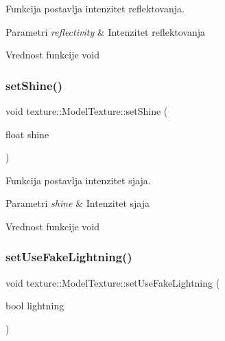 Funkcija postavlja intenzitet reflektovanja. 


\begin{DoxyParams}{Parametri}
{\em reflectivity} & Intenzitet reflektovanja \\
\hline
\end{DoxyParams}
\begin{DoxyReturn}{Vrednost funkcije}
void 
\end{DoxyReturn}
\mbox{\label{classtexture_1_1ModelTexture_a782076c3a92f7d92cd45a92c5ef088a1}} 
\subsubsection{\texorpdfstring{set\+Shine()}{setShine()}}
{\footnotesize\ttfamily void texture\+::\+Model\+Texture\+::set\+Shine (\begin{DoxyParamCaption}\item[{float}]{shine }\end{DoxyParamCaption})}



Funkcija postavlja intenzitet sjaja. 


\begin{DoxyParams}{Parametri}
{\em shine} & Intenzitet sjaja \\
\hline
\end{DoxyParams}
\begin{DoxyReturn}{Vrednost funkcije}
void 
\end{DoxyReturn}
\mbox{\label{classtexture_1_1ModelTexture_a616d99807f2487d6723380ec03b57ede}} 
\subsubsection{\texorpdfstring{set\+Use\+Fake\+Lightning()}{setUseFakeLightning()}}
{\footnotesize\ttfamily void texture\+::\+Model\+Texture\+::set\+Use\+Fake\+Lightning (\begin{DoxyParamCaption}\item[{bool}]{lightning }\end{DoxyParamCaption})}



